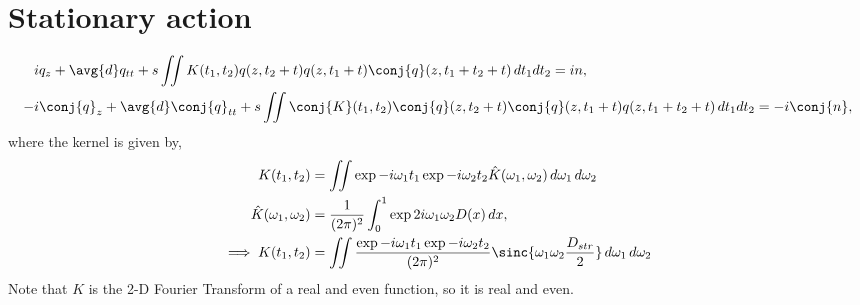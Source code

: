 \section{Stationary action}
\begin{equation}\label{equ:DMNLSE}
\begin{split}
i&q_z + \avg{d}q_{tt}  + s\iint K(t_1,t_2) q(z,t_2+t) q(z,t_1+t) \conj{q}(z,t_1+t_2+t)   \,dt_1 dt_2 = in, \\
-i&\conj{q}_z + \avg{d}\conj{q}_{tt} + s\iint \conj{K}(t_1,t_2)  \conj{q}(z,t_2+t) \conj{q}(z,t_1+t) q(z,t_1+t_2+t)  \,dt_1 dt_2 = -i\conj{n}, \\
\end{split}
\end{equation}
where the kernel is given by,
\begin{equation}\label{equ:DMNLSE_Kernal}
\begin{split}
K(t_1,t_2) &= \iint \exp{-i \omega_1 t_1} \exp{-i \omega_2 t_2 }   \hat{K}(\omega_1,\omega_2) \,d\omega_1 \,d\omega_2 \\
\hat{K}(\omega_1,\omega_2) &= \frac{1}{(2\pi)^2}\int_{0}^{1} \exp{2i\omega_1\omega_2 D(x)}  \,dx,  \\
\implies K(t_1,t_2) &= \iint \frac{\exp{-i \omega_1 t_1 } \exp{-i \omega_2 t_2 }}{(2\pi)^2}  \sinc{\omega_1\omega_2 \frac{D_{str}}{2}} \,d\omega_1 \,d\omega_2
\end{split}
\end{equation}
Note that $K$ is the 2-D Fourier Transform of a real and even function, so it is real and even.
